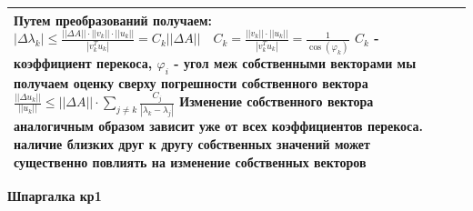 \documentclass[a4paper,2pt]{article}
\begin{document}
\begin{tabular}{|p{}|p{}|p{}|}
Путем преобразований получаем:
\(|\Delta\lambda_k|\leq \frac{||\Delta A||\cdot||v_k||\cdot||u_k||}{|v_k^Tu_k|} = C_k||\Delta A|| \quad C_k = \frac{||v_k||\cdot||u_k||}{|v_k^Tu_k|} = \frac{1}{\cos(\varphi_k)}\)
\(C_k\) - коэффициент перекоса, \(\varphi_i\) - угол меж собственными векторами
мы получаем оценку сверху погрешности собственного вектора \(\frac{||\Delta u_k||}{||u_k||} \leq ||\Delta A|| \cdot \sum_{j \neq k} \frac{C_j}{|\lambda_k - \lambda_j|} \)
Изменение собственного вектора аналогичным образом зависит уже от всех коэффициентов перекоса.
наличие близких друг к другу собственных значений может существенно повлиять на изменение собственных векторов
\\\hline

\end{tabular}


\newpage

\begin{center}
  {\large\bf Шпаргалка кр1}
\end{center}
\end{document}
